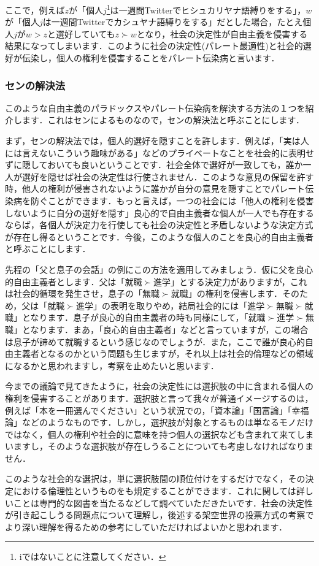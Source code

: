 ここで，例えば$z$が「個人$j$\footnote{iではないことに注意してください．}は一週間Twitterでヒシュカリヤナ語縛りをする」，$w$が「個人$j$は一週間Twitterでカシュヤナ語縛りをする」だとした場合，たとえ個人$j$が$w > z$と選好していても$z \succ w$となり，社会の決定性が自由主義を侵害する結果になってしまいます．このように社会の決定性(パレート最適性)と社会的選好が伝染し，個人の権利を侵害することをパレート伝染病と言います．

\subsubsection*{センの解決法}
このような自由主義のパラドックスやパレート伝染病を解決する方法の１つを紹介します．これはセンによるものなので，センの解決法と呼ぶことにします．

まず，センの解決法では，個人的選好を隠すことを許します．例えば，「実は人には言えないこういう趣味がある」などのプライベートなことを社会的に表明せずに隠しておいても良いということです．社会全体で選好が一致しても，誰か一人が選好を隠せば社会の決定性は行使されません．このような意見の保留を許す時，他人の権利が侵害されないように誰かが自分の意見を隠すことでパレート伝染病を防ぐことができます．もっと言えば，一つの社会には「他人の権利を侵害しないように自分の選好を隠す」良心的で自由主義者な個人が一人でも存在するならば，各個人が決定力を行使しても社会の決定性と矛盾しないような決定方式が存在し得るということです．今後，このような個人のことを良心的自由主義者と呼ぶことにします．

先程の「父と息子の会話」の例にこの方法を適用してみましょう．仮に父を良心的自由主義者とします．父は「就職$\succ$進学」とする決定力がありますが，これは社会的循環を発生させ，息子の「無職$\succ$就職」の権利を侵害します．そのため，父は「就職$\succ$進学」の表明を取りやめ，結局社会的には「進学$\succ$無職$\succ$就職」となります．息子が良心的自由主義者の時も同様にして，「就職$\succ$進学$\succ$無職」となります．まあ，「良心的自由主義者」などと言っていますが，この場合は息子が諦めて就職するという感じなのでしょうが．また，ここで誰が良心的自由主義者となるのかという問題も生じますが，それ以上は社会的倫理などの領域になるかと思われますし，考察を止めたいと思います．

今までの議論で見てきたように，社会の決定性には選択肢の中に含まれる個人の権利を侵害することがあります．選択肢と言って我々が普通イメージするのは，例えば「本を一冊選んでください」という状況での，「資本論」「国富論」「幸福論」などのようなものです．しかし，選択肢が対象とするものは単なるモノだけではなく，個人の権利や社会的に意味を持つ個人の選択なども含まれて来てしまいますし，そのような選択肢が存在しうることについても考慮しなければなりません．

このような社会的な選択は，単に選択肢間の順位付けをするだけでなく，その決定における倫理性というものをも規定することができます．これに関しては詳しいことは専門的な図書を当たるなどして調べていただきたいです．社会の決定性が引き起こしうる問題点について理解し，後述する架空世界の投票方式の考察でより深い理解を得るための参考にしていただければよいかと思われます．

